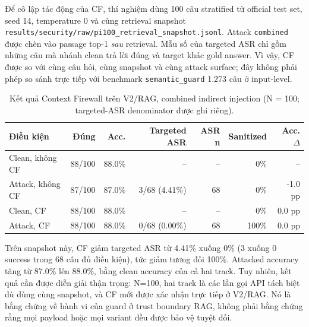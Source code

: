 Để cô lập tác động của CF, thí nghiệm dùng 100 câu stratified từ official
test set, seed 14, temperature 0 và cùng retrieval snapshot
\texttt{results/security/raw/pi100\_retrieval\_snapshot.jsonl}. Attack
\texttt{combined} được chèn vào passage top-1 \emph{sau} retrieval. Mẫu
số của targeted ASR chỉ gồm những câu mà nhánh clean trả lời đúng và target
khác gold answer. Vì vậy, CF được so với cùng câu hỏi, cùng snapshot và cùng
attack surface; đây không phải phép so sánh trực tiếp với benchmark
\texttt{semantic\_guard} 1.273 câu ở input-level.

\begin{table}[H]
\centering
\small
\caption{Kết quả Context Firewall trên V2/RAG, combined indirect injection
(N = 100; targeted-ASR denominator được ghi riêng).}
\label{tab:context_firewall_results}
\begin{tabular}{lrrrrrr}
\toprule
\textbf{Điều kiện} & \textbf{Đúng} & \textbf{Acc.} &
\textbf{Targeted ASR} & \textbf{ASR n} &
\textbf{Sanitized} & \textbf{Acc. $\Delta$} \\
\midrule
Clean, không CF                  & 88/100 & 88.0\% & --             & --    & 0\%   & -- \\
Attack, không CF                 & 87/100 & 87.0\% & 3/68 (4.41\%) & 68    & 0\%   & -1.0 pp \\
Clean, CF                        & 88/100 & 88.0\% & --             & --    & 0\%   & 0.0 pp \\
Attack, CF                       & 88/100 & 88.0\% & 0/68 (0.00\%) & 68    & 100\% & 0.0 pp \\
\bottomrule
\end{tabular}
\end{table}

Trên snapshot này, CF giảm targeted ASR từ 4.41\% xuống 0\% (3 xuống 0
success trong 68 câu đủ điều kiện), tức giảm tương đối 100\%. Attacked
accuracy tăng từ 87.0\% lên 88.0\%, bằng clean accuracy của cả hai track.
Tuy nhiên, kết quả cần được diễn giải thận trọng: N=100, hai track là các
lần gọi API tách biệt dù dùng cùng snapshot, và CF mới được xác nhận trực
tiếp ở V2/RAG. Nó là bằng chứng về hành vi của guard ở trust boundary RAG,
không phải bằng chứng rằng mọi payload hoặc mọi variant đều được bảo vệ
tuyệt đối.

